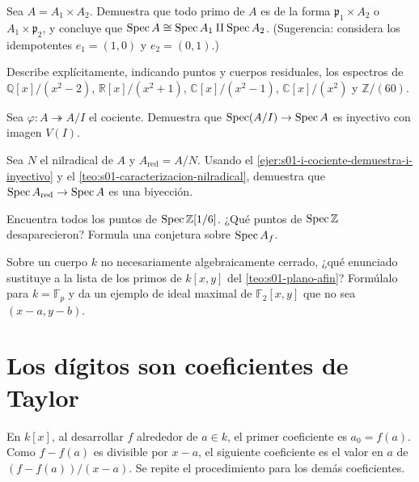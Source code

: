 \begin{ejer}
\label{ejer:s01-espectro-producto-anillos}
Sea $A=A_1\times A_2$. Demuestra que todo primo de $A$ es de la forma $\mathfrak p_1\times A_2$ o $A_1\times\mathfrak p_2$, y concluye que $\operatorname{Spec} A\cong\operatorname{Spec} A_1\amalg\operatorname{Spec} A_2$. (Sugerencia: considera los idempotentes $e_1=(1,0)$ y $e_2=(0,1)$.)
\end{ejer}
\begin{ejer}
\label{ejer:s01-describe-explicitamente-indicando-puntos-cuerpos}
Describe explícitamente, indicando puntos y cuerpos residuales, los espectros de $\mathbb Q[x]/(x^2-2)$, $\mathbb R[x]/(x^2+1)$, $\mathbb C[x]/(x^2-1)$, $\mathbb C[x]/(x^2)$ y $\mathbb Z/(60)$.
\end{ejer}
\begin{ejer}
\label{ejer:s01-i-cociente-demuestra-i-inyectivo}
Sea $\varphi\colon A\twoheadrightarrow A/I$ el cociente. Demuestra que $\operatorname{Spec}(A/I)\to\operatorname{Spec} A$ es inyectivo con imagen $V(I)$.
\end{ejer}
\begin{ejer}
\label{ejer:s01-n-nilradical-red-n-usando}
Sea $N$ el nilradical de $A$ y $A_{\mathrm{red}}=A/N$. Usando el \cref{ejer:s01-i-cociente-demuestra-i-inyectivo} y el \cref{teo:s01-caracterizacion-nilradical}, demuestra que $\operatorname{Spec} A_{\mathrm{red}}\to\operatorname{Spec} A$ es una biyección.
\end{ejer}
\begin{ejer}
\label{ejer:s01-encuentra-todos-puntos-z-1}
Encuentra todos los puntos de $\operatorname{Spec}\mathbb Z[1/6]$. ¿Qué puntos de $\operatorname{Spec}\mathbb Z$ desaparecieron? Formula una conjetura sobre $\operatorname{Spec} A_f$.
\end{ejer}
\begin{ejer}
\label{ejer:s01-sobre-cuerpo-k-no-necesariamente}
Sobre un cuerpo $k$ no necesariamente algebraicamente cerrado, ¿qué enunciado sustituye a la lista de los primos de $k[x,y]$ del \cref{teo:s01-plano-afin}? Formúlalo para $k=\mathbb F_p$ y da un ejemplo de ideal maximal de $\mathbb F_2[x,y]$ que no sea $(x-a,y-b)$.
\end{ejer}

\section{Los dígitos son coeficientes de Taylor}

En $k[x]$, al desarrollar $f$ alrededor de $a\in k$, el primer coeficiente es $a_0=f(a)$. Como $f-f(a)$ es divisible por $x-a$, el siguiente coeficiente es el valor en $a$ de $(f-f(a))/(x-a)$. Se repite el procedimiento para los demás coeficientes.

